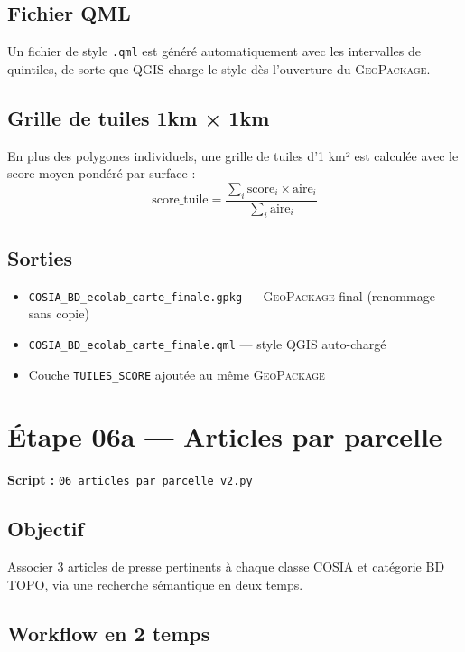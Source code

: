\documentclass[12pt,a4paper]{report}
\newcommand{\code}[1]{\texttt{\small #1}}
\newcommand{\gpkg}{\textsc{GeoPackage}}
\newcommand{\bdtopo}{\textsc{BD TOPO}}
\begin{document}
\subsection{Fichier QML}

Un fichier de style \code{.qml} est généré automatiquement avec les intervalles de quintiles, de sorte que QGIS charge le style dès l'ouverture du \gpkg{}.

\subsection{Grille de tuiles 1km × 1km}

En plus des polygones individuels, une grille de tuiles d'1 km² est calculée avec le score moyen pondéré par surface :
$$
\text{score\_tuile} = \frac{\sum_i \text{score}_i \times \text{aire}_i}{\sum_i \text{aire}_i}
$$

\subsection{Sorties}

\begin{itemize}
  \item \code{COSIA\_BD\_ecolab\_carte\_finale.gpkg} — \gpkg{} final (renommage sans copie)
  \item \code{COSIA\_BD\_ecolab\_carte\_finale.qml} — style QGIS auto-chargé
  \item Couche \code{TUILES\_SCORE} ajoutée au même \gpkg{}
\end{itemize}

\section{Étape 06a — Articles par parcelle}

\textbf{Script :} \code{06\_articles\_par\_parcelle\_v2.py}

\subsection{Objectif}

Associer 3 articles de presse pertinents à chaque classe COSIA et catégorie \bdtopo{}, via une recherche sémantique en deux temps.

\subsection{Workflow en 2 temps}
\end{document}

